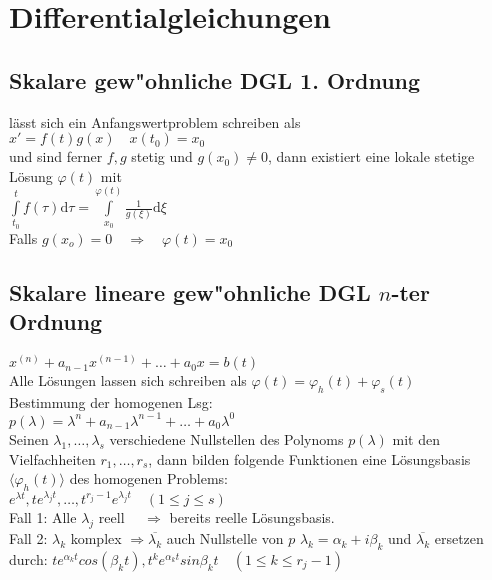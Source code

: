 \documentclass[10pt,a4paper^, twocolumn]{article}
\renewcommand{\phi}{\varphi} %
\renewcommand{\d}{\mathrm{d}} %
\begin{document}
\section{Differentialgleichungen}
\subsection{Skalare gew"ohnliche DGL 1. Ordnung}
	lässt sich ein Anfangswertproblem schreiben als \\ $x' = f(t)g(x) \quad x(t_0) = x_0$  \\
	und sind ferner $f,g$ stetig und $g(x_0) \neq 0$, dann existiert eine lokale stetige Lösung $\phi(t)$ mit \\
	$\int\limits_{t_0}^t f(\tau) \d \tau = \int\limits_{x_0}^{\phi(t)} \frac{1}{g(\xi)} \d \xi$ \\
	Falls $g(x_o) = 0  \quad \Rightarrow \quad \phi(t) = x_0$

\subsection{Skalare lineare gew"ohnliche DGL $n$-ter Ordnung}
	$x^{(n)} + a_{n-1}x^{(n-1)} + \dots + a_0x = b(t)$ \\
	Alle Lösungen lassen sich schreiben als $\phi(t) = \phi_h(t) + \phi_s(t)$ \\
	Bestimmung der homogenen Lsg: \\
	$p(\lambda) = \lambda^n + a_{n-1}\lambda^{n-1} + \dots + a_0\lambda^0$  \\
	Seinen $\lambda_1,\dots,\lambda_s$ verschiedene Nullstellen des Polynoms $p(\lambda)$ mit den Vielfachheiten $r_1,\dots,r_s$,
	dann bilden folgende Funktionen eine Lösungsbasis $\langle \phi_h(t) \rangle$ des homogenen Problems: \\
	$e^{\lambda t}, te^{\lambda_jt},\dots,t^{r_j-1}e^{\lambda_jt} \quad ( 1 \leq j \leq s )$ \\
	Fall 1: Alle $\lambda_j$ reell $\quad \Rightarrow$ bereits reelle Lösungsbasis. \\
	Fall 2: $\lambda_k$ komplex $\Rightarrow \overline{\lambda_k}$ auch Nullstelle von $p$
		$\lambda_k = \alpha_k + i\beta_k$ und $\overline{\lambda_k}$ ersetzen durch: 
		$te^{\alpha_kt}cos(\beta_kt), t^ke^{\alpha_kt}sin{\beta_kt} \quad (1 \leq k \leq r_j-1)$
\end{document}
